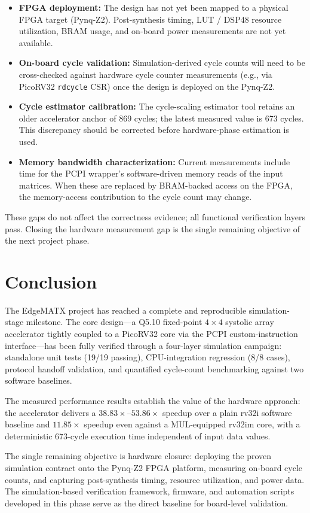 ﻿\documentclass[12pt,a4paper]{report}
\begin{document}
\begin{itemize}
    \item \textbf{FPGA deployment:} The design has not yet been mapped to a physical FPGA target (Pynq-Z2).
          Post-synthesis timing, LUT / DSP48 resource utilization, BRAM usage, and on-board power measurements are not yet available.

    \item \textbf{On-board cycle validation:} Simulation-derived cycle counts will need to be cross-checked against hardware cycle counter measurements (e.g., via PicoRV32 \texttt{rdcycle} CSR) once the design is deployed on the Pynq-Z2.

    \item \textbf{Cycle estimator calibration:} The cycle-scaling estimator tool retains an older accelerator anchor of 869 cycles; the latest measured value is 673 cycles.
          This discrepancy should be corrected before hardware-phase estimation is used.

    \item \textbf{Memory bandwidth characterization:} Current measurements include time for the PCPI wrapper's software-driven memory reads of the input matrices.
          When these are replaced by BRAM-backed access on the FPGA, the memory-access contribution to the cycle count may change.
\end{itemize}

These gaps do not affect the correctness evidence; all functional verification layers pass.
Closing the hardware measurement gap is the single remaining objective of the next project phase.


\chapter{Conclusion}

The EdgeMATX project has reached a complete and reproducible simulation-stage milestone.
The core design---a Q5.10 fixed-point $4 \times 4$ systolic array accelerator tightly coupled to a PicoRV32 core via the PCPI custom-instruction interface---has been fully verified through a four-layer simulation campaign: standalone unit tests (19/19 passing), CPU-integration regression (8/8 cases), protocol handoff validation, and quantified cycle-count benchmarking against two software baselines.

The measured performance results establish the value of the hardware approach: the accelerator delivers a $38.83\times$--$53.86\times$ speedup over a plain rv32i software baseline and $11.85\times$ speedup even against a MUL-equipped rv32im core, with a deterministic 673-cycle execution time independent of input data values.

The single remaining objective is hardware closure: deploying the proven simulation contract onto the Pynq-Z2 FPGA platform, measuring on-board cycle counts, and capturing post-synthesis timing, resource utilization, and power data.
The simulation-based verification framework, firmware, and automation scripts developed in this phase serve as the direct baseline for board-level validation.



\end{document}
